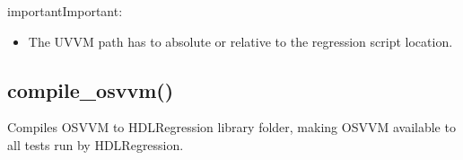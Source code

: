\documentclass[letterpaper,10pt,english]{sphinxmanual}
\begin{document}
\sphinxAtStartPar
{}

\begin{sphinxVerbatim}[commandchars=\\\{\}]
\end{sphinxVerbatim}

\begin{sphinxadmonition}{important}{Important:}\begin{itemize}
\item {} 
\sphinxAtStartPar
The UVVM path has to absolute or relative to the regression script location.

\end{itemize}
\end{sphinxadmonition}


\subsection{compile\_osvvm()}
\label{\detokenize{api:compile-osvvm}}
\sphinxAtStartPar
Compiles OSVVM to HDLRegression library folder, making OSVVM available to all tests run by HDLRegression.

\begin{sphinxVerbatim}[commandchars=\\\{\}]
\end{sphinxVerbatim}
\end{document}
